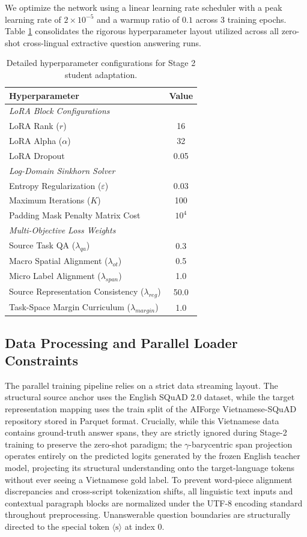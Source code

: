 \documentclass[11pt]{article}
\begin{document}
We optimize the network using a linear learning rate scheduler with a peak learning rate of $2\times 10^{-5}$ and a warmup ratio of $0.1$ across 3 training epochs. Table \ref{tab:hyperparameters} consolidates the rigorous hyperparameter layout utilized across all zero-shot cross-lingual extractive question answering runs.

\begin{table}[H]
\centering
\small
\begin{tabular}{lc}
\toprule
\textbf{Hyperparameter} & \textbf{Value} \\
\midrule
\multicolumn{2}{l}{\textit{LoRA Block Configurations}} \\
LoRA Rank ($r$) & 16 \\
LoRA Alpha ($\alpha$) & 32 \\
LoRA Dropout & 0.05 \\
\midrule
\multicolumn{2}{l}{\textit{Log-Domain Sinkhorn Solver}} \\
Entropy Regularization ($\varepsilon$) & 0.03 \\
Maximum Iterations ($K$) & 100 \\
Padding Mask Penalty Matrix Cost & $10^4$ \\
\midrule
\multicolumn{2}{l}{\textit{Multi-Objective Loss Weights}} \\
Source Task QA ($\lambda_{qa}$) & 0.3 \\
Macro Spatial Alignment ($\lambda_{ot}$) & 0.5 \\
Micro Label Alignment ($\lambda_{span}$) & 1.0 \\
Source Representation Consistency ($\lambda_{reg}$) & 50.0 \\
Task-Space Margin Curriculum ($\lambda_{margin}$) & 1.0 \\
\bottomrule
\end{tabular}
\caption{Detailed hyperparameter configurations for Stage 2 student adaptation.}
\label{tab:hyperparameters}
\end{table}

\subsection{Data Processing and Parallel Loader Constraints}
The parallel training pipeline relies on a strict data streaming layout. The structural source anchor uses the English SQuAD 2.0 dataset, while the target representation mapping uses the train split of the AIForge Vietnamese-SQuAD repository stored in Parquet format. Crucially, while this Vietnamese data contains ground-truth answer spans, they are strictly ignored during Stage-2 training to preserve the zero-shot paradigm; the $\gamma$-barycentric span projection operates entirely on the predicted logits generated by the frozen English teacher model, projecting its structural understanding onto the target-language tokens without ever seeing a Vietnamese gold label. To prevent word-piece alignment discrepancies and cross-script tokenization shifts, all linguistic text inputs and contextual paragraph blocks are normalized under the UTF-8 encoding standard throughout preprocessing. Unanswerable question boundaries are structurally directed to the special token $\langle\text{s}\rangle$ at index 0.
\end{document}
